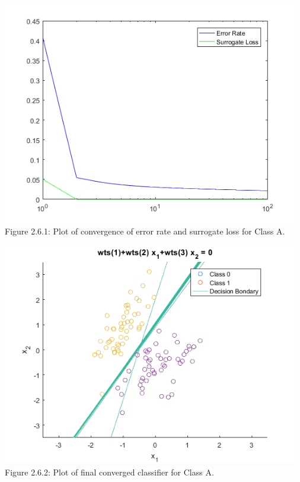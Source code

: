 \documentclass[]{report}   %
\begin{document}
\begin{center}
	\includegraphics[width=35em]{2_6_Figure_1.png}
	{Figure 2.6.1: Plot of convergence of error rate and surrogate loss for Class A.}
\end{center} 

\begin{center}
	\includegraphics[width=35em]{2_6_Figure_2.png}
	{Figure 2.6.2: Plot of final converged classifier for Class A.}
\end{center} 
\end{document}

